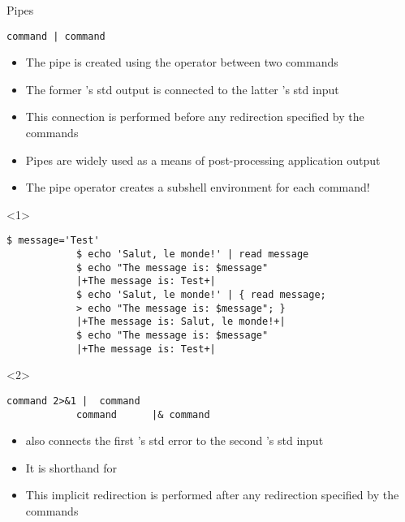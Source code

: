 \begin{frame}[fragile]{Pipes}
    \vspace{-3mm}
    \begin{lstlisting}[style=MyBash, numbers=none]
        command | command
    \end{lstlisting}
    \vspace{2mm}
    \begin{itemize}
        \item The pipe is created using the \PB{\texttt{|}} operator between two commands
        \item The former 's std output is connected to the latter 's std input
        \item This connection is performed before any redirection specified by the commands
        \item Pipes are widely used as a means of post-processing application output
        \item \alert{The pipe operator creates a subshell environment for each command!} 
    \end{itemize}
    \begin{onlyenv}<1>
        \begin{lstlisting}[style=MyBash, aboveskip=3mm]
            $ message='Test'
            $ echo 'Salut, le monde!' | read message
            $ echo "The message is: $message"
            |+The message is: Test+|
            $ echo 'Salut, le monde!' | { read message;
            > echo "The message is: $message"; }
            |+The message is: Salut, le monde!+|
            $ echo "The message is: $message"
            |+The message is: Test+|
        \end{lstlisting}
    \end{onlyenv}
    \begin{onlyenv}<2>
        \begin{lstlisting}[style=MyBash, numbers=none, aboveskip=3mm]
            command 2>&1 |  command
            command      |& command
        \end{lstlisting}
        \vspace{2mm}
        \begin{itemize}
            \item \PB{\texttt{|\&}} also connects the first 's std error to the second 's std input
            \item It is shorthand for 
            \item This implicit redirection is performed after any redirection specified by the commands
        \end{itemize}
    \end{onlyenv}
\end{frame}
